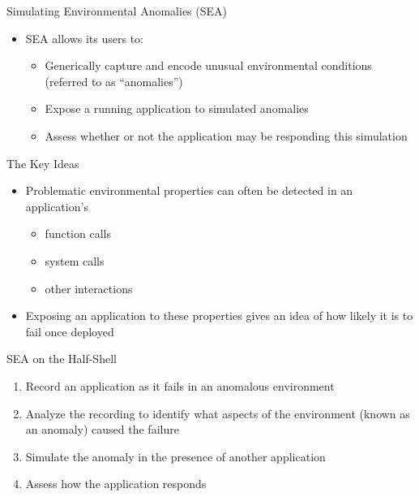 \documentclass[pdf]{beamer}
\begin{document}
\begin{frame}{Simulating Environmental Anomalies (SEA)}
  \begin{itemize}
  \item{SEA allows its users to:}
    \begin{itemize}
    \item{Generically capture and encode unusual environmental
      conditions (referred to as ``anomalies'')}
    \item{Expose a running application to simulated anomalies}
    \item{Assess whether or not the application may be responding this
      simulation}
    \end{itemize}
  \end{itemize}
\end{frame}


\begin{frame}{The Key Ideas}
  \begin{itemize}
  \item{Problematic environmental properties can often be detected in an
    application's}
    \begin{itemize}
    \item{function calls}
    \item{system calls}
    \item{other interactions}
  \end{itemize}
  \item{Exposing an application to these properties gives an idea of how
    likely it is to fail once deployed}
  \end{itemize}
\end{frame}


\begin{frame}{SEA on the Half-Shell}
  \begin{enumerate}
  \item{Record an application as it fails in an anomalous environment}
  \item{Analyze the recording to identify what aspects of the environment
    (known as an anomaly) caused the failure}
  \item{Simulate the anomaly in the presence of another application}
  \item{Assess how the application responds}
  \end{enumerate}
\end{frame}
\end{document}
